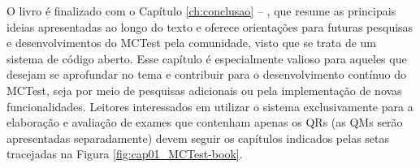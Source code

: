 \begin{description}

\end{description}

O livro é finalizado com o Capítulo \ref{ch:conclusao} -- , que resume as principais ideias apresentadas ao longo do texto e oferece orientações para futuras pesquisas e desenvolvimentos do MCTest pela comunidade, visto que se trata de um sistema de código aberto. Esse capítulo é especialmente valioso para aqueles que desejam se aprofundar no tema e contribuir para o desenvolvimento contínuo do MCTest, seja por meio de pesquisas adicionais ou pela implementação de novas funcionalidades. Leitores interessados em utilizar o sistema exclusivamente para a elaboração e avaliação de exames que contenham apenas os QRs (as QMs serão apresentadas separadamente) devem seguir os capítulos indicados pelas setas tracejadas na Figura \ref{fig:cap01_MCTest-book}.